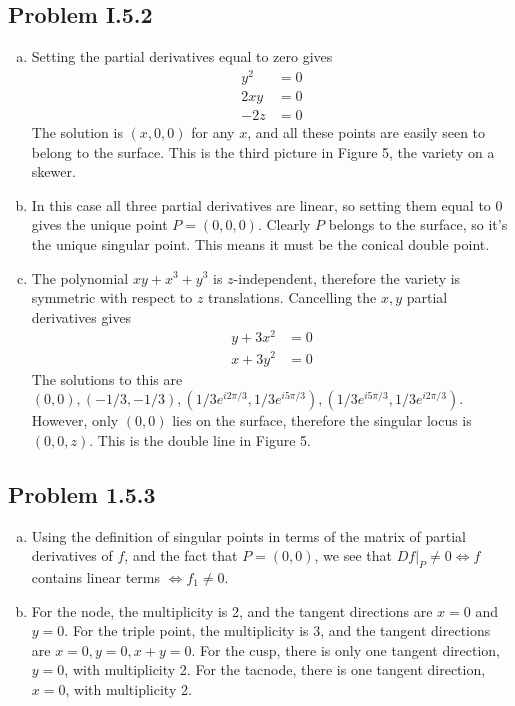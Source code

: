 \documentclass{mathnotes}
\begin{document}
\subsection*{Problem I.5.2}
\begin{enumerate}[(a)]
\item Setting the partial derivatives equal to zero gives
	\begin{align*}
	y^2 &= 0   \\
	2xy &= 0 \\
	-2z &= 0  \end{align*}
	The solution is $(x,0,0)$ for any $x$, and all these points are easily seen to belong to the surface. This is the
	third picture in Figure 5, the variety on a skewer.
\item In this case all three partial derivatives are linear, so setting them equal to 0 gives the unique point $P =(0,0,0)$.
	Clearly $P$ belongs to the surface, so it's the unique singular point. This means it must be the conical double
	point.
\item The polynomial $xy + x^3 + y^3$ is $z$-independent, therefore the variety is symmetric with respect to 
	$z$ translations. Cancelling the $x, y$ partial derivatives gives
	\begin{align*}
	y+3x^2 &= 0  \\
	x+3y^2 &= 0 \end{align*}
    The solutions to this are $(0,0), (-1/3,-1/3), (1/3 e^{i2\pi/3}, 1/3 e^{i5\pi/3}), (1/3 e^{i5\pi/3}, 1/3 e^{i2\pi/3})$.
    However, only $(0,0)$ lies on the surface, therefore the singular locus is $(0,0,z)$. This is the double line in Figure 5.
\end{enumerate}

\subsection*{Problem 1.5.3}
\begin{enumerate}[(a)]
\item Using the definition of singular points in terms of the matrix of partial derivatives of $f$, and the 
	fact that $P = (0,0)$, we see that $Df|_P \neq 0 \Leftrightarrow f$ contains linear terms $\Leftrightarrow 
	f_1 \neq 0$.
\item For the node, the multiplicity is 2, and the tangent directions are $x=0$ and $y=0$. For the triple point, 
	the multiplicity is 3, and the tangent directions are $x=0, y=0, x+y = 0$. For the cusp, there is only one 
	tangent direction, $y=0$, with multiplicity 2. For the tacnode, there is one tangent direction, $x=0$, with 
	multiplicity 2.
\end{enumerate}
\end{document}
